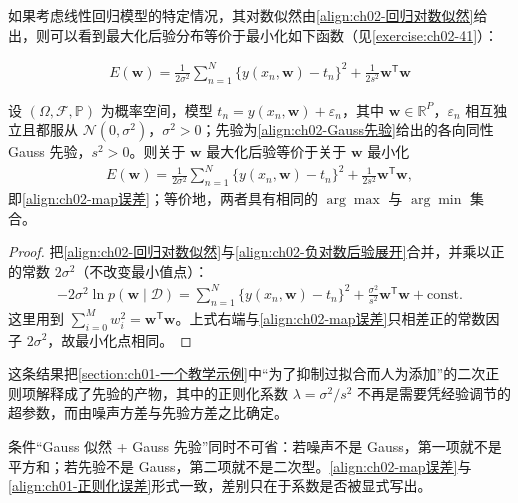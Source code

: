 \documentclass[../../main.tex]{subfiles}
\begin{document}
如果考虑线性回归模型的特定情况，其对数似然由\eqref{align:ch02-回归对数似然}给出，则可以看到最大化后验分布等价于最小化如下函数（见\cref{exercise:ch02-41}）：

\begin{align}
  E(\mathbf{w}) = \frac{1}{2\sigma^{2}}\sum_{n=1}^{N}\big\{y(x_n,\mathbf{w})-t_n\big\}^{2} + \frac{1}{2s^{2}}\mathbf{w}^{\mathsf{T}}\mathbf{w}
  \label{align:ch02-map误差}
\end{align}

\begin{proposition}\label{proposition:ch02-map正则化}
设 $(\Omega,\mathcal{F},\mathbb{P})$ 为概率空间，模型 $t_n=y(x_n,\mathbf{w})+\varepsilon_n$，其中 $\mathbf{w}\in\mathbb{R}^{P}$，$\varepsilon_n$ 相互独立且都服从 $\mathcal{N}(0,\sigma^{2})$，$\sigma^{2}>0$；先验为\eqref{align:ch02-Gauss先验}给出的各向同性 Gauss 先验，$s^{2}>0$。则关于 $\mathbf{w}$ 最大化后验等价于关于 $\mathbf{w}$ 最小化
\begin{align*}
  E(\mathbf{w})=\frac{1}{2\sigma^{2}}\sum_{n=1}^{N}\big\{y(x_n,\mathbf{w})-t_n\big\}^{2}+\frac{1}{2s^{2}}\mathbf{w}^{\mathsf{T}}\mathbf{w},
\end{align*}
即\eqref{align:ch02-map误差}；等价地，两者具有相同的 $\arg\max$ 与 $\arg\min$ 集合。
\end{proposition}

\begin{proof}
把\eqref{align:ch02-回归对数似然}与\eqref{align:ch02-负对数后验展开}合并，并乘以正的常数 $2\sigma^{2}$（不改变最小值点）：
\begin{align*}
  -2\sigma^{2}\ln p(\mathbf{w}\mid\mathcal{D})
  = \sum_{n=1}^{N}\big\{y(x_n,\mathbf{w})-t_n\big\}^{2} + \frac{\sigma^{2}}{s^{2}}\mathbf{w}^{\mathsf{T}}\mathbf{w} + \text{const} .
\end{align*}
这里用到 $\sum_{i=0}^{M}w_i^{2}=\mathbf{w}^{\mathsf{T}}\mathbf{w}$。上式右端与\eqref{align:ch02-map误差}只相差正的常数因子 $2\sigma^{2}$，故最小化点相同。
\end{proof}

\begin{remark}
这条结果把\cref{section:ch01-一个教学示例}中“为了抑制过拟合而人为添加”的二次正则项解释成了先验的产物，其中的正则化系数 $\lambda=\sigma^{2}/s^{2}$ 不再是需要凭经验调节的超参数，而由噪声方差与先验方差之比确定。

条件“Gauss 似然 + Gauss 先验”同时不可省：若噪声不是 Gauss，第一项就不是平方和；若先验不是 Gauss，第二项就不是二次型。\eqref{align:ch02-map误差}与\eqref{align:ch01-正则化误差}形式一致，差别只在于系数是否被显式写出。
\end{remark}
\end{document}
